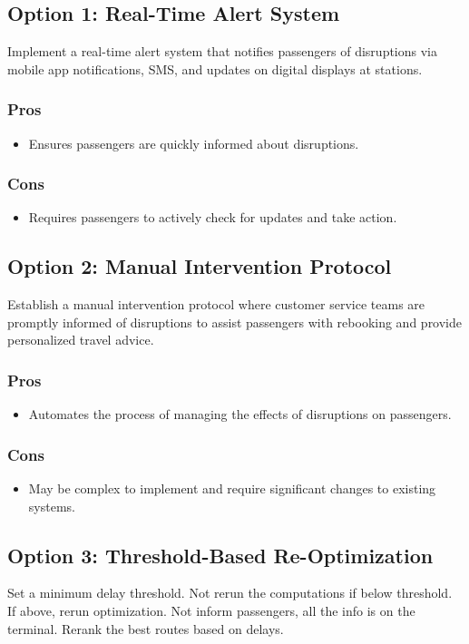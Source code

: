 \documentclass{article}
\begin{document}
\subsection*{Option 1: Real-Time Alert System}
Implement a real-time alert system that notifies passengers of disruptions via mobile app notifications, SMS, and updates on digital displays at stations.
\subsubsection*{Pros}
\begin{itemize}
    \item Ensures passengers are quickly informed about disruptions.
\end{itemize}
\subsubsection*{Cons}
\begin{itemize}
    \item Requires passengers to actively check for updates and take action.
\end{itemize}

\subsection*{Option 2: Manual Intervention Protocol}
Establish a manual intervention protocol where customer service teams are promptly informed of disruptions to assist passengers with rebooking and provide personalized travel advice.
\subsubsection*{Pros}
\begin{itemize}
    \item Automates the process of managing the effects of disruptions on passengers.
\end{itemize}
\subsubsection*{Cons}
\begin{itemize}
    \item May be complex to implement and require significant changes to existing systems.
\end{itemize}

\subsection*{Option 3: Threshold-Based Re-Optimization}
Set a minimum delay threshold. Not rerun the computations if below threshold. If above, rerun optimization. Not inform passengers, all the info is on the terminal. Rerank the best routes based on delays.
\end{document}
